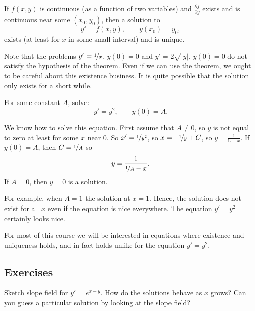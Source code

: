 \begin{theorem}%
\label{slope:picardthm}%
If $f(x,y)$ is continuous (as a function of two
variables) and $\frac{\partial f}{\partial y}$ exists and is
continuous near some $(x_0,y_0)$, then a solution to
\begin{equation*}
y' = f(x,y), \qquad y(x_0) = y_0,
\end{equation*}
exists (at least for $x$ in some small interval) and is unique.
\end{theorem}

Note that the problems $y' = \nicefrac{1}{x}$, $y(0) = 0$ and 
$y' = 2 \sqrt{\lvert y \rvert}$, $y(0) = 0$ do not satisfy the hypothesis of the
theorem.
Even if we can use the theorem,
we ought to be careful about this existence business.  It is quite
possible that the solution only exists for a short while.

\begin{example}
For some constant $A$, solve:
\begin{equation*}
y' = y^2, \qquad y(0) = A .
\end{equation*}

We know how to solve this equation.  First assume that $A \not= 0$,
so $y$ is not equal to zero at least for some $x$ near 0.  So
$x' = \nicefrac{1}{y^2}$, so
$x = \nicefrac{-1}{y} + C$, so $y = \frac{1}{C-x}$.  If $y(0) = A$, then
$C = \nicefrac{1}{A}$ so
\begin{equation*}
y = \frac{1}{\nicefrac{1}{A} - x} .
\end{equation*}
If $A=0$, then $y=0$ is a solution.

For example, when $A=1$
the solution  at $x=1$.  Hence, the solution does not exist
for all $x$ even if the equation is nice everywhere.  The equation
$y' = y^2$ certainly
looks nice.
\end{example}

For most of this
course we will be interested in equations where existence and
uniqueness holds, and in fact holds  unlike for the equation
$y'=y^2$.

\subsection{Exercises}

\begin{exercise}
Sketch slope field for $y'=e^{x-y}$.  How do the solutions behave as $x$
grows?  Can you guess a particular solution by looking at the slope
field?
\end{exercise}

